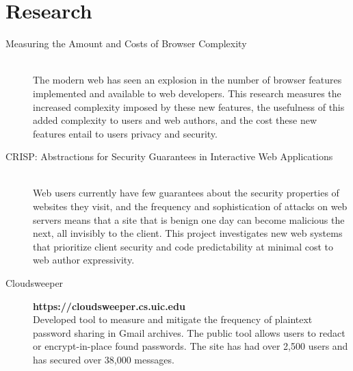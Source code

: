 \documentclass{vitae}
\begin{document}
  \section{Research}
  \begin{description}

    \item[Measuring the Amount and Costs of Browser Complexity] ~\\
    The modern web has seen an explosion in the number of browser features implemented and available to web developers.  This research measures the increased complexity imposed by these new features, the usefulness of this added complexity to users and web authors, and the cost these new features entail to users privacy and security.

    \item[CRISP: Abstractions for Security Guarantees in Interactive Web Applications] ~\\
    Web users currently have few guarantees about the security properties of websites they visit, and the frequency and sophistication of attacks on web servers means that a site that is benign one day can become malicious the next, all invisibly to the client.  This project investigates new web systems that prioritize client security and code predictability at minimal cost to web author expressivity.

    \item[Cloudsweeper] \hfill \textbf{https://cloudsweeper.cs.uic.edu}\\
    Developed tool to measure and mitigate the frequency of plaintext password sharing in Gmail archives. The public tool allows users to redact or encrypt-in-place found passwords. The site has had over 2,500 users and has secured over 38,000 messages.
  \end{description}
\end{document}

